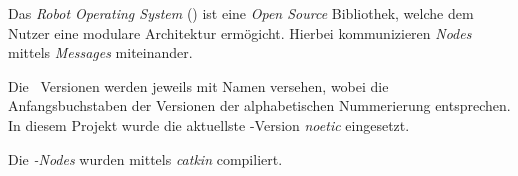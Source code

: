 
Das \textit{Robot Operating System} (\ROS) ist eine \textit{Open Source} Bibliothek, welche dem Nutzer eine modulare Architektur ermögicht.
Hierbei kommunizieren \textit{Nodes} mittels \textit{Messages} miteinander.


Die \ROS\ Versionen werden jeweils mit Namen versehen, wobei die Anfangsbuchstaben der Versionen der alphabetischen Nummerierung entsprechen. In diesem Projekt wurde die aktuellste \ROS-Version \textit{noetic} eingesetzt.


Die \ROS\textit{-Nodes} wurden mittels \textit{catkin} compiliert.






